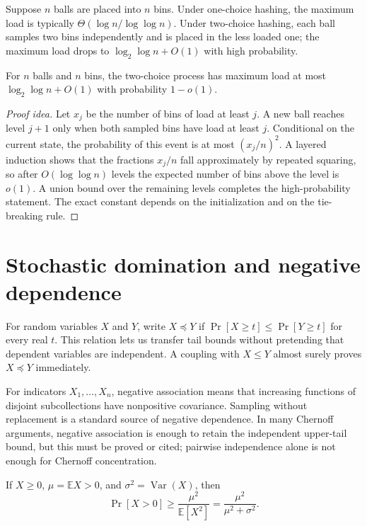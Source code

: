 Suppose $n$ balls are placed into $n$ bins.  Under one-choice hashing, the
maximum load is typically $\Theta(\log n/\log\log n)$.  Under two-choice
hashing, each ball samples two bins independently and is placed in the less
loaded one; the maximum load drops to $\log_2\log n+O(1)$ with high
probability.

\begin{theorem}
For $n$ balls and $n$ bins, the two-choice process has maximum load at most
$\log_2\log n+O(1)$ with probability $1-o(1)$.
\end{theorem}

\begin{proof}[Proof idea]
Let $x_j$ be the number of bins of load at least $j$.  A new ball reaches
level $j+1$ only when both sampled bins have load at least $j$.  Conditional
on the current state, the probability of this event is at most
$(x_j/n)^2$.  A layered induction shows that the fractions $x_j/n$ fall
approximately by repeated squaring, so after $O(\log\log n)$ levels the
expected number of bins above the level is $o(1)$.  A union bound over the
remaining levels completes the high-probability statement.  The exact
constant depends on the initialization and on the tie-breaking rule.
\end{proof}

\section{Stochastic domination and negative dependence}

For random variables $X$ and $Y$, write $X\preceq Y$ if
$\Pr[X\geq t]\leq\Pr[Y\geq t]$ for every real $t$.  This relation lets us
transfer tail bounds without pretending that dependent variables are
independent.  A coupling with $X\leq Y$ almost surely proves
$X\preceq Y$ immediately.

For indicators $X_1,\ldots,X_n$, negative association means that increasing
functions of disjoint subcollections have nonpositive covariance.  Sampling
without replacement is a standard source of negative dependence.  In many
Chernoff arguments, negative association is enough to retain the independent
upper-tail bound, but this must be proved or cited; pairwise independence
alone is not enough for Chernoff concentration.

\begin{lemma}
If $X\geq0$, $\mu=\mathbb{E}X>0$, and $\sigma^2=\operatorname{Var}(X)$, then
\[
 \Pr[X>0]\geq\frac{\mu^2}{\mathbb{E}[X^2]}
 =\frac{\mu^2}{\mu^2+\sigma^2}.
\]
\end{lemma}

